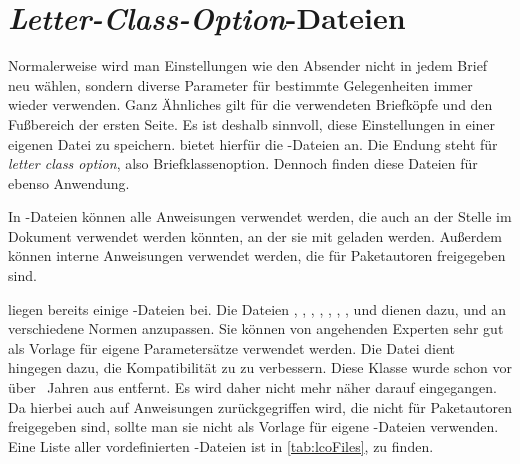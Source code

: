 

\section{\emph{Letter-Class-Option}-Dateien}
%
\BeginIndexGroup
{}%
%

Normalerweise wird man Einstellungen wie den Absender nicht in jedem Brief neu
wählen, sondern diverse Parameter für bestimmte Gelegenheiten immer wieder
verwenden. Ganz Ähnliches gilt für die verwendeten Briefköpfe und den
Fußbereich der ersten Seite. Es ist deshalb sinnvoll, diese Einstellungen in
einer eigenen Datei zu speichern. \KOMAScript{} bietet
hierfür die -Dateien an. Die Endung  steht
für \emph{\emph{l}etter \emph{c}lass \emph{o}ption}, also
Briefklassenoption. Dennoch finden diese Dateien für 
ebenso Anwendung.

In -Dateien können alle Anweisungen verwendet werden, die auch an
der Stelle im Dokument verwendet werden könnten, an der
sie mit 
geladen werden. Außerdem können interne Anweisungen verwendet werden, die für
Paketautoren freigegeben sind.%

\KOMAScript{} liegen bereits einige -Dateien bei. Die Dateien
, ,
,
, ,
, ,  und
 dienen dazu, 
und  an verschiedene Normen anzupassen. Sie
können von angehenden Experten sehr gut als Vorlage für eigene Parametersätze
verwendet werden. Die Datei  dient hingegen dazu, die
Kompatibilität zu  zu verbessern. Diese
Klasse wurde schon vor über \the\numexpr {}\relax~Jahren aus
\KOMAScript{} entfernt. Es wird daher nicht mehr näher darauf eingegangen. Da
hierbei auch auf Anweisungen zurückgegriffen wird, die nicht für Paketautoren
freigegeben sind, sollte man sie nicht als Vorlage für eigene
-Dateien verwenden. Eine Liste aller vordefinierten
-Dateien ist in \autoref{tab:lcoFiles}, 
zu finden.

